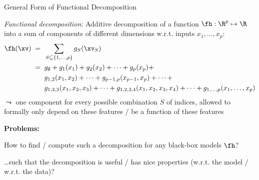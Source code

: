 \documentclass[10pt,compress,t,notes=noshow, xcolor=table]{beamer}
\newcommand{\open}{}
\newcommand{\close}{}
\begin{document}
\begin{framev}[align=top]{General Form of Functional Decomposition
}
\begin{definition}
\textit{Functional decomposition}: Additive decomposition of a function $\fh: \R^p \mapsto \R$ into a sum of components of different dimensions w.r.t. inputs $x_1, \ldots, x_p$: 
\begin{equation*}
\begin{split}
\fh(\xv)
\; = \; \; & \sum_{S \subseteq \{1,\ldots,p\}} g_{S}(\xv_S) \\
\; = \; \; & g_{\open \emptyset \close} +
g_{\open 1 \close}(x_1) + g_{\open 2 \close}(x_2) + \dots + g_{\open p \close}(x_p) + \\
& g_{\open 1, 2 \close}(x_1, x_2) + \dots + g_{\open p-1, p \close}(x_{p-1}, x_p) + \dots + \\
& g_{\open 1, 2, 3 \close}(x_1, x_2, x_3) + \dots +
g_{\open 1, 2, 3, 4 \close}(x_1, x_2, x_3, x_4) + \dots +
g_{\open 1,\ldots,p \close}(x_1, \ldots, x_p)
\end{split}    
\end{equation*}
$\leadsto$ one component for every possible combination $S$ of indices, allowed to formally only depend on these features / be a function of these features
\end{definition}
\textbf{Problems:}
\begin{itemizeM}
\item How to find / compute such a decomposition for any black-box models $\fh$?
\item \dots such that the decomposition is useful / has nice properties (w.r.t. the model / w.r.t. the data)?
\end{itemizeM}
\end{framev}
\end{document}
